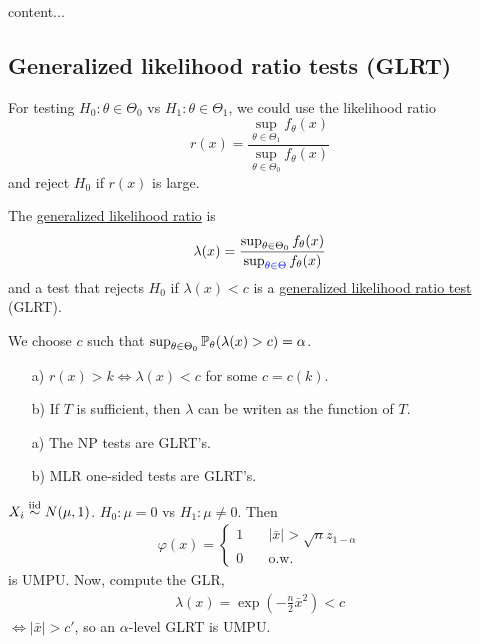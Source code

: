 \begin{exap}
	content...
\end{exap}

\subsection{Generalized likelihood ratio tests (GLRT)}
\begin{mydef}
	For testing $H_0: \theta\in \Theta_0$ vs $H_1: \theta \in \Theta_1$, we could use the likelihood ratio
	$$r(x) = \frac{ \sup_{\theta \in \Theta_1} f_\theta(x) }{ \sup_{\theta \in \Theta_0} f_\theta(x) }$$
	and reject $H_0$ if $r(x)$ is large.
\end{mydef}

\begin{mydef}
	The \uline{generalized likelihood ratio} is
	\begin{align*}
		\lambda(x) = \frac{ \sup_{\theta \in \Theta_0} f_\theta(x) }{ \sup_{{\color{blue} \theta \in \Theta}} f_\theta(x) }
	\end{align*}
	and a test that rejects $H_0$ if $\lambda(x)<c$ is a \uline{generalized likelihood ratio test} (GLRT).
\end{mydef}
\begin{remark}
	We choose $c$ such that $\sup_{\theta\in \Theta_0} \mathbb{P}_\theta(\lambda(x)>c) =\alpha$.
\end{remark}

\begin{prop}\textbf{ }
	\begin{enumerate}
		\item[a)] $r(x)> k \iff \lambda(x)< c$ for some $c = c(k)$. 
		
		\item[b)] If $T$ is sufficient, then $\lambda$ can be writen as the function of $T$.
	\end{enumerate}
\end{prop}

\begin{prop}\textbf{ }
	\begin{enumerate}
		\item[a)] The NP tests are GLRT's.
		
		\item[b)] MLR one-sided tests are GLRT's.
	\end{enumerate}
\end{prop}

\begin{exap}
	$X_i \stackrel{\text{iid}}{\sim} N(\mu,1)$. $H_0: \mu=0$ vs $H_1: \mu \neq 0$. Then
	\begin{align*}
		\varphi(x) = \begin{cases}
		1 &\quad |\bar{x}|>\sqrt{n}z_{1-\alpha}  \\
		0 &\quad \text{o.w.}
		\end{cases}
	\end{align*}
	is UMPU. Now, compute the GLR,
	\begin{align*}
		\lambda(x) = \exp( -\frac{n}{2} \bar{x}^2 ) < c
	\end{align*}
	$\iff |\bar{x}|> c'$, so an $\alpha$-level GLRT is UMPU.
\end{exap}

